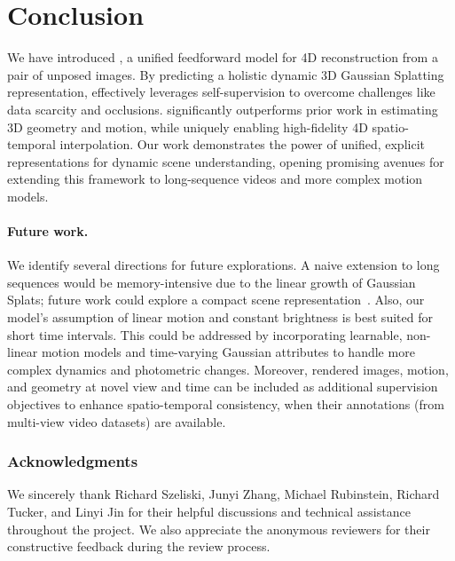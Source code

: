 \section{Conclusion}
\label{sec:conclusion}


We have introduced \ourmethod{}, a unified feedforward model for 4D reconstruction from a pair of unposed images. By predicting a holistic dynamic 3D Gaussian Splatting representation, \ourmethod{} effectively leverages self-supervision to overcome challenges like data scarcity and occlusions. \ourmethod{} significantly outperforms prior work in estimating 3D geometry and motion, while uniquely enabling high-fidelity 4D spatio-temporal interpolation. Our work demonstrates the power of unified, explicit representations for dynamic scene understanding, opening promising avenues for extending this framework to long-sequence videos and more complex motion models.


\paragraph{Future work.}
We identify several directions for future explorations. A naive extension to long sequences would be memory-intensive due to the linear growth of Gaussian Splats; future work could explore a compact scene representation~\citep{An:2025:C3G,Xu:2025:RSL}. 
Also, our model's assumption of linear motion and constant brightness is best suited for short time intervals. This could be addressed by incorporating learnable, non-linear motion models and time-varying Gaussian attributes to handle more complex dynamics and photometric changes.
Moreover, rendered images, motion, and geometry at novel view and time can be included as additional supervision objectives to enhance spatio-temporal consistency, when their annotations (\eg from multi-view video datasets) are available. 

\subsubsection*{Acknowledgments}
We sincerely thank Richard Szeliski, Junyi Zhang, Michael Rubinstein, Richard Tucker, and Linyi Jin for their helpful discussions and technical assistance throughout the project. We also appreciate the anonymous reviewers for their constructive feedback during the review process.